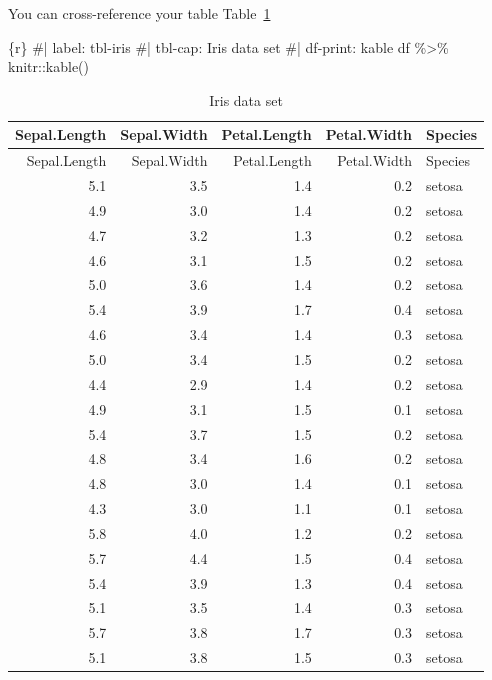 \documentclass[
  letterpaper,
  DIV=11,
  numbers=noendperiod]{scrreprt}
\newenvironment{Shaded}{\begin{snugshade}}{\end{snugshade}}
\newcommand{\CommentTok}[1]{\textcolor[rgb]{0.37,0.37,0.37}{#1}}
\newcommand{\FunctionTok}[1]{\textcolor[rgb]{0.28,0.35,0.67}{#1}}
\newcommand{\InformationTok}[1]{\textcolor[rgb]{0.37,0.37,0.37}{#1}}
\newcommand{\NormalTok}[1]{\textcolor[rgb]{0.00,0.23,0.31}{#1}}
\newcommand{\SpecialCharTok}[1]{\textcolor[rgb]{0.37,0.37,0.37}{#1}}
\begin{document}
You can cross-reference your table Table~\ref{tbl-iris}

\begin{Shaded}
\begin{Highlighting}[]
\InformationTok{\textasciigrave{}\textasciigrave{}\textasciigrave{}\{r\}}
\CommentTok{\#| label: tbl{-}iris}
\CommentTok{\#| tbl{-}cap: Iris data set}
\CommentTok{\#| df{-}print: kable}
\NormalTok{df }\SpecialCharTok{\%\textgreater{}\%} 
\NormalTok{  knitr}\SpecialCharTok{::}\FunctionTok{kable}\NormalTok{()}
\InformationTok{\textasciigrave{}\textasciigrave{}\textasciigrave{}}
\end{Highlighting}
\end{Shaded}

\hypertarget{tbl-iris}{}
\begin{longtable}[]{@{}rrrrl@{}}
\caption{\label{tbl-iris}Iris data set}\tabularnewline
\toprule()
Sepal.Length & Sepal.Width & Petal.Length & Petal.Width & Species \\
\midrule()
\endfirsthead
\toprule()
Sepal.Length & Sepal.Width & Petal.Length & Petal.Width & Species \\
\midrule()
\endhead
5.1 & 3.5 & 1.4 & 0.2 & setosa \\
4.9 & 3.0 & 1.4 & 0.2 & setosa \\
4.7 & 3.2 & 1.3 & 0.2 & setosa \\
4.6 & 3.1 & 1.5 & 0.2 & setosa \\
5.0 & 3.6 & 1.4 & 0.2 & setosa \\
5.4 & 3.9 & 1.7 & 0.4 & setosa \\
4.6 & 3.4 & 1.4 & 0.3 & setosa \\
5.0 & 3.4 & 1.5 & 0.2 & setosa \\
4.4 & 2.9 & 1.4 & 0.2 & setosa \\
4.9 & 3.1 & 1.5 & 0.1 & setosa \\
5.4 & 3.7 & 1.5 & 0.2 & setosa \\
4.8 & 3.4 & 1.6 & 0.2 & setosa \\
4.8 & 3.0 & 1.4 & 0.1 & setosa \\
4.3 & 3.0 & 1.1 & 0.1 & setosa \\
5.8 & 4.0 & 1.2 & 0.2 & setosa \\
5.7 & 4.4 & 1.5 & 0.4 & setosa \\
5.4 & 3.9 & 1.3 & 0.4 & setosa \\
5.1 & 3.5 & 1.4 & 0.3 & setosa \\
5.7 & 3.8 & 1.7 & 0.3 & setosa \\
5.1 & 3.8 & 1.5 & 0.3 & setosa \\

\end{longtable}
\end{document}
